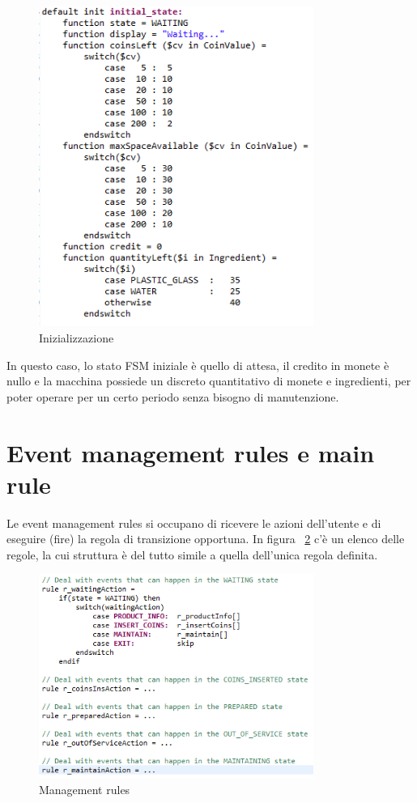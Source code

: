 \begin{figure}[h]
	\centering
	\includegraphics[width=0.8\textwidth]{Immagini/InitialState.png}
	\caption{Inizializzazione}
	\label{fig:initialState}
\end{figure}
In questo caso, lo stato FSM iniziale è quello di attesa, il credito in monete è nullo e la macchina possiede un discreto quantitativo di monete e ingredienti, per poter operare per un certo periodo senza bisogno di manutenzione.

\section{Event management rules e main rule}
Le event management rules si occupano di ricevere le azioni dell’utente e di eseguire (fire) la regola di transizione opportuna. In figura ~\ref{fig:managementRules} c’è un elenco delle regole, la cui struttura è del tutto simile a quella dell’unica regola definita. 

\begin{figure}[h]
	\centering
	\includegraphics[width=0.8\textwidth]{Immagini/ManagementRule.png}
	\caption{Management rules}
	\label{fig:managementRules}
\end{figure}

